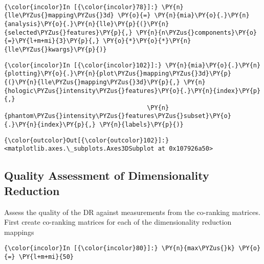     \begin{center}
    \end{center}
    { \hspace*{\fill} \\}

    \begin{Verbatim}[commandchars=\\\{\}]
{\color{incolor}In [{\color{incolor}78}]:} \PY{n}{lle\PYZus{}mapping\PYZus{}3d} \PY{o}{=} \PY{n}{mia}\PY{o}{.}\PY{n}{analysis}\PY{o}{.}\PY{n}{lle}\PY{p}{(}\PY{n}{selected\PYZus{}features}\PY{p}{,} \PY{n}{n\PYZus{}components}\PY{o}{=}\PY{l+m+mi}{3}\PY{p}{,} \PY{o}{*}\PY{o}{*}\PY{n}{lle\PYZus{}kwargs}\PY{p}{)}
\end{Verbatim}

    \begin{Verbatim}[commandchars=\\\{\}]
{\color{incolor}In [{\color{incolor}102}]:} \PY{n}{mia}\PY{o}{.}\PY{n}{plotting}\PY{o}{.}\PY{n}{plot\PYZus{}mapping\PYZus{}3d}\PY{p}{(}\PY{n}{lle\PYZus{}mapping\PYZus{}3d}\PY{p}{,} \PY{n}{hologic\PYZus{}intensity\PYZus{}features}\PY{o}{.}\PY{n}{index}\PY{p}{,}
                                       \PY{n}{phantom\PYZus{}intensity\PYZus{}features\PYZus{}subset}\PY{o}{.}\PY{n}{index}\PY{p}{,} \PY{n}{labels}\PY{p}{)}
\end{Verbatim}

            \begin{Verbatim}[commandchars=\\\{\}]
{\color{outcolor}Out[{\color{outcolor}102}]:} <matplotlib.axes.\_subplots.Axes3DSubplot at 0x107926a50>
\end{Verbatim}

    \subsection{Quality Assessment of Dimensionality
Reduction}\label{quality-assessment-of-dimensionality-reduction}

    Assess the quality of the DR against measurements from the co-ranking
matrices. First create co-ranking matrices for each of the
dimensionality reduction mappings

    \begin{Verbatim}[commandchars=\\\{\}]
{\color{incolor}In [{\color{incolor}80}]:} \PY{n}{max\PYZus{}k} \PY{o}{=} \PY{l+m+mi}{50}
\end{Verbatim}

